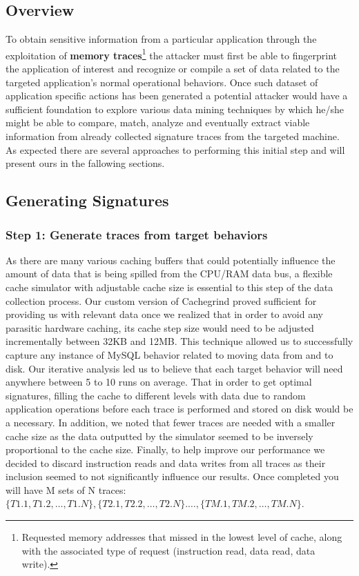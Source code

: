 \documentclass[11pt,a4paper, titlepage, oneside]{article}
\begin{document}
\subsection{Overview}
To obtain sensitive information from a particular application through the exploitation of \textbf{memory traces}\footnote{Requested memory addresses that missed in the lowest level of cache, along with the associated type of request (instruction read, data read, data write).} the attacker must first be able to fingerprint the application of interest and recognize or compile a set of data related to the targeted application's normal operational behaviors. Once such dataset of application specific actions has been generated a potential attacker would have a sufficient foundation to explore various data mining techniques by which he/she might be able to compare, match, analyze and eventually extract viable information from already collected signature traces from the targeted machine. As expected there are several approaches to performing this initial step and will present ours in the fallowing sections.

\subsection{Generating Signatures}
\subsubsection{Step 1: Generate traces from target behaviors}
As there are many various caching buffers that could potentially influence the amount of data that is being spilled from the CPU/RAM data bus, a flexible cache simulator with adjustable cache size is essential to this step of the data collection process. Our custom version of Cachegrind proved sufficient for providing us with relevant data once we realized that in order to avoid any parasitic hardware caching, its cache step size would need to be adjusted incrementally between 32KB and 12MB. This technique allowed us to successfully capture any instance of MySQL behavior related to moving data from and to disk.  Our iterative analysis led us to believe that each target behavior will need anywhere between 5 to 10 runs on average. That in order to get optimal signatures, filling the cache to different levels with data due to random application operations before each trace is performed and stored on disk would be a necessary. In addition, we noted that fewer traces are needed with a smaller cache size as the data outputted by the simulator seemed to be inversely proportional to the cache size. Finally, to help improve our performance we decided to discard instruction reads and data writes from all traces as their inclusion seemed to not significantly influence our results.
Once completed you will have M sets of N traces: \\$\{T1.1, T1.2, \ldots, T1.N\}, \{T2.1, T2.2, \ldots, T2.N\}. \ldots, \{TM.1, TM.2, \ldots, TM.N\}$.
\end{document}
